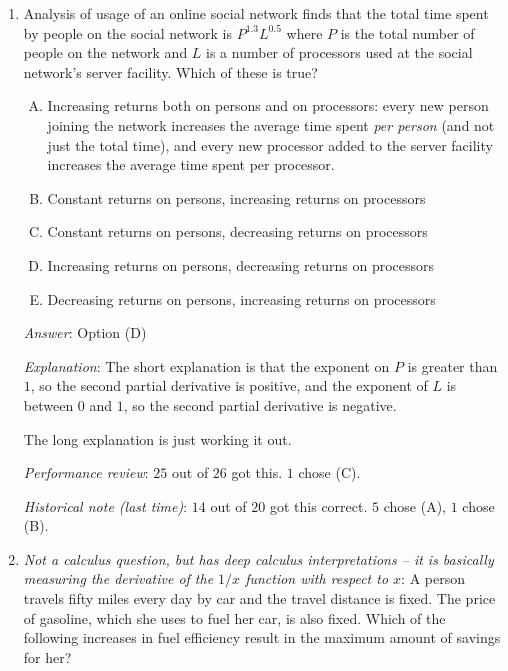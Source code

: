 \documentclass[10pt]{amsart}
\begin{document}
\begin{enumerate}
  {\em Historical note (last time)}: $12$ out of $20$ people got this
  correct. $7$ chose (A) and $1$ chose (D). The people who chose (A)
  probably didn't note that an increase in the degree of substitution
  would mean a decrease in the derivative, rather than an increase.

\item Analysis of usage of an online social network finds that the
  total time spent by people on the social network is $P^{1.3}L^{0.5}$
  where $P$ is the total number of people on the network and $L$ is a
  number of processors used at the social network's server
  facility. Which of these is true?

  \begin{enumerate}[(A)]
  \item Increasing returns both on persons and on processors: every
    new person joining the network increases the average time spent
    {\em per person} (and not just the total time), and every new
    processor added to the server facility increases the average time
    spent per processor.
  \item Constant returns on persons, increasing returns on processors
  \item Constant returns on persons, decreasing returns on processors
  \item Increasing returns on persons, decreasing returns on processors
  \item Decreasing returns on persons, increasing returns on processors
  \end{enumerate}

  {\em Answer}: Option (D)

  {\em Explanation}: The short explanation is that the exponent on $P$
  is greater than $1$, so the second partial derivative is positive,
  and the exponent of $L$ is between $0$ and $1$, so the second
  partial derivative is negative.

  The long explanation is just working it out.

  {\em Performance review}: $25$ out of $26$ got this. $1$ chose (C).

  {\em Historical note (last time)}: $14$ out of $20$ got this correct. $5$
  chose (A), $1$ chose (B).

\item {\em Not a calculus question, but has deep calculus
  interpretations -- it is basically measuring the derivative of the
  $1/x$ function with respect to $x$}: A person travels fifty miles
  every day by car and the travel distance is fixed. The price of
  gasoline, which she uses to fuel her car, is also fixed. Which of
  the following increases in fuel efficiency result in the maximum
  amount of savings for her?


\end{enumerate}
\end{document}
